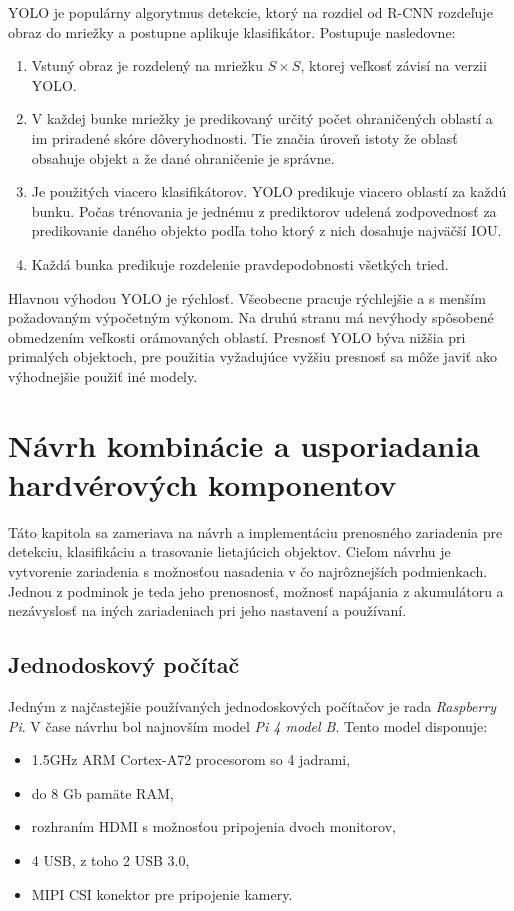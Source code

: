         \ac{YOLO} je populárny algorytmus detekcie, ktorý na rozdiel od \ac{R-CNN} rozdeľuje obraz do mriežky a postupne aplikuje klasifikátor. Postupuje nasledovne:

        \begin{enumerate}
            \item Vstuný obraz je rozdelený na mriežku \(S \times S\), ktorej veľkosť závisí na verzii \ac{YOLO}.
            \item V každej bunke mriežky je predikovaný určitý počet ohraničených oblastí a im priradené skóre dôveryhodnosti. Tie značia úroveň istoty že oblasť obsahuje objekt a že dané ohraničenie je správne.
            \item Je použitých viacero klasifikátorov. \ac{YOLO} predikuje viacero oblastí za každú bunku. Počas trénovania je jednému z prediktorov udelená zodpovednosť za predikovanie daného objekto podľa toho ktorý z nich dosahuje najväčší \ac{IOU}.
            \item Každá bunka predikuje rozdelenie pravdepodobnosti všetkých tried.
        \end{enumerate}

        Hlavnou výhodou \ac{YOLO} je rýchlosť. Všeobecne pracuje rýchlejšie a s menším požadovaným výpočetným výkonom. Na druhú stranu má nevýhody spôsobené obmedzením veľkosti orámovaných oblastí. Presnosť \ac{YOLO} býva nižšia pri primalých objektoch, pre použitia vyžadujúce vyžšiu presnosť sa môže javiť ako výhodnejšie použiť iné modely.

\chapter{Návrh kombinácie a usporiadania hardvérových komponentov}

    Táto kapitola sa zameriava na návrh a implementáciu prenosného zariadenia pre detekciu, klasifikáciu a trasovanie lietajúcich objektov. Cieľom návrhu je vytvorenie zariadenia s možnosťou nasadenia v čo najrôznejších podmienkach. Jednou z podminok je teda jeho prenosnosť, možnosť napájania z akumulátoru a nezávyslosť na iných zariadeniach pri jeho nastavení a používaní.

    \section{Jednodoskový počítač}
    
        Jedným z najčastejšie používaných jednodoskových počítačov je rada \emph{Raspberry Pi}. V čase návrhu bol najnovším model \emph{Pi 4 model B}. Tento model disponuje:
        \begin{itemize}
            \item 1.5GHz ARM Cortex-A72 procesorom so 4 jadrami,
            \item do 8 Gb pamäte RAM,
            \item rozhraním HDMI s možnosťou pripojenia dvoch monitorov,
            \item 4 USB, z toho 2 USB 3.0,
            \item MIPI CSI konektor pre pripojenie kamery.
        \end{itemize}


